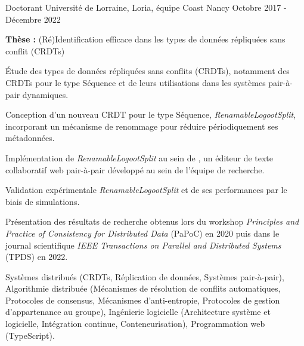 
\begin{cventries}

\cventry
    {Doctorant}
    {Université de Lorraine, Loria, équipe Coast}
    {Nancy}
    {Octobre 2017 - Décembre 2022}
    {}

\vspace{-1.5em}
\begin{cvparagraph}
    \textbf{Thèse :} (Ré)Identification efficace dans les types de données répliquées sans conflit (CRDTs)

    \medskip
    \begin{cvitems} %
        \item Étude des types de données répliquées sans conflits (CRDTs), notamment des CRDTs pour le type Séquence et de leurs utilisations dans les systèmes pair-à-pair dynamiques.
        \item Conception d'un nouveau CRDT pour le type Séquence, \emph{RenamableLogootSplit}, incorporant  un mécanisme de renommage pour réduire périodiquement ses métadonnées.
        \item Implémentation de \emph{RenamableLogootSplit} au sein de , un éditeur de texte collaboratif web pair-à-pair développé au sein de l'équipe de recherche.
        \item Validation expérimentale \emph{RenamableLogootSplit} et de ses performances par le biais de simulations.
        \item Présentation des résultats de recherche obtenus lors du workshop \emph{Principles and Practice of Consistency for Distributed Data} (PaPoC) en 2020 puis dans le journal scientifique \emph{IEEE Transactions on Parallel and Distributed Systems} (TPDS) en 2022.
    \end{cvitems}

    \bigskip
    \begin{description}[labelindent=1.6em,itemsep=-0.3em]
        \item {}
        \item {}
    \end{description}

    \medskip
     Systèmes distribués (CRDTs, Réplication de données, Systèmes pair-à-pair), Algorithmie distribuée (Mécanismes de résolution de conflits automatiques, Protocoles de consensus, Mécanismes d'anti-entropie, Protocoles de gestion d'appartenance au groupe), Ingénierie logicielle (Architecture système et logicielle, Intégration continue, Conteneurisation), Programmation web (TypeScript).
\end{cvparagraph}


\end{cventries}

